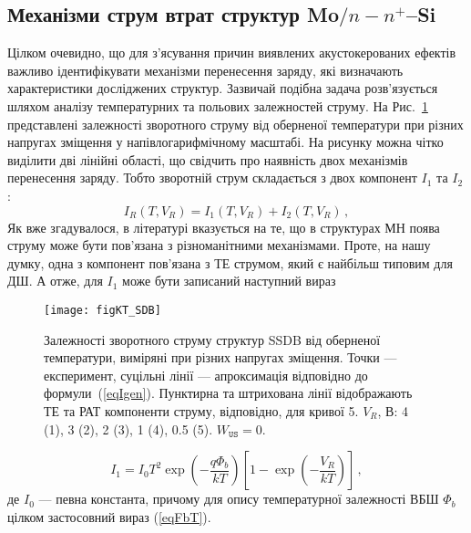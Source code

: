 \subsection{Механізми струм втрат структур Mo$/n-n^+$--Si}

Цілком очевидно, що для з'ясування причин виявлених акустокерованих ефектів важливо ідентифікувати
механізми перенесення заряду, які визначають характеристики досліджених структур.
Зазвичай подібна задача розв'язується шляхом аналізу температурних та польових залежностей струму.
На Рис.~\ref{figKT_SDB} представлені залежності зворотного струму від оберненої температури при різних напругах зміщення
у напівлогарифмічному масштабі.
На рисунку можна чітко виділити дві лінійні області, що свідчить про наявність двох механізмів
перенесення заряду.
Тобто зворотній струм складається з двох компонент $I_{1}$ та $I_2$:
\begin{equation}\label{eqIsum}
    I_R(T,V_R)=I_1(T,V_R)+I_2(T,V_R)\,,
\end{equation}
Як вже згадувалося, в літературі вказується на те, що в структурах МН поява струму може бути пов'язана з
різноманітними механізмами.
Проте, на нашу думку, одна з компонент пов'язана з ТЕ струмом, який є найбільш типовим для ДШ.
А отже, для $I_1$ може бути записаний наступний вираз

\begin{figure}
\center
\texttt{[image: figKT\_SDB]}
\caption{\label{figKT_SDB}
Залежності зворотного струму структур SSDB від оберненої температури,
виміряні при різних напругах зміщення.
Точки --- експеримент,
суцільні лінії --- апроксимація відповідно до формули~(\ref{eqIgen}).
Пунктирна та штрихована лінії відображають ТЕ та РАТ компоненти струму, відповідно, для кривої 5.
$V_R$, В: 4 (1), 3 (2), 2 (3), 1 (4), 0.5 (5).
$W_\mathtt{US}=0$.
}%
\end{figure}

\begin{equation}\label{eqIte_SDB}
    I_1=I_0T^2\exp\left(-\frac{q\Phi_b}{kT}\right)\left[1-\exp\left(-\frac{V_R}{kT}\right)\right]\,,
\end{equation}
де $I_0$ --- певна константа,
причому для опису температурної залежності ВБШ $\Phi_b$ цілком застосовний вираз (\ref{eqFbT}).

